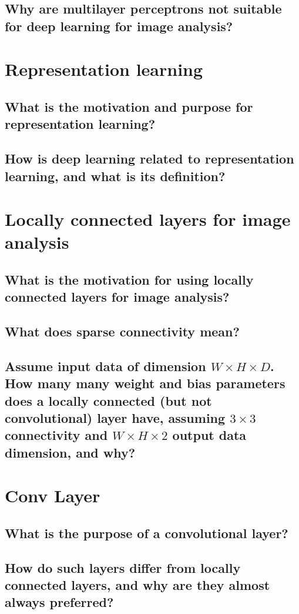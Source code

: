 \subsection{Why are multilayer perceptrons not suitable for deep learning for image analysis?}

\section{Representation learning}
\subsection{What is the motivation and purpose for representation learning?}
\subsection{How is deep learning related to representation learning, and what is its definition?}

\section{Locally connected layers for image analysis}
\subsection{What is the motivation for using locally connected layers for image analysis?}
\subsection{What does sparse connectivity mean?}
\subsection{Assume input data of dimension $W \times H \times D$. How many many weight and bias parameters does a locally connected (but not convolutional) layer have, assuming $3 \times 3$ connectivity and $W \times H \times 2$ output data dimension, and why?}

\section{Conv Layer}
\subsection{What is the purpose of a convolutional layer?}
\subsection{How do such layers differ from locally connected layers, and why are they almost always preferred?}
